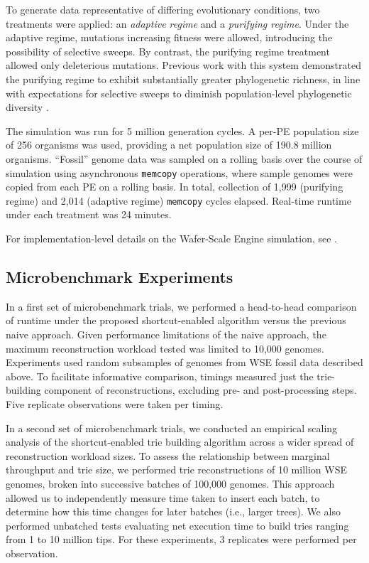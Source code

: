 To generate data representative of differing evolutionary conditions, two treatments were applied: an
\textit{adaptive regime} and a \textit{purifying regime}.
Under the adaptive regime, mutations increasing fitness were allowed, introducing the possibility of selective sweeps.
By contrast, the purifying regime treatment allowed only deleterious mutations.
Previous work with this system demonstrated the purifying regime to exhibit substantially greater phylogenetic richness, in line with expectations for selective sweeps to diminish population-level phylogenetic diversity \citep{moreno2024trackable}.

The simulation was run for 5 million generation cycles.
A per-PE population size of 256 organisms was used, providing a net population size of 190.8 million organisms.
``Fossil'' genome data was sampled on a rolling basis over the course of simulation using asynchronous \texttt{memcopy} operations, where sample genomes were copied from each PE on a rolling basis.
In total, collection of 1,999 (purifying regime) and 2,014 (adaptive regime) \texttt{memcopy} cycles elapsed.
Real-time runtime under each treatment was 24 minutes.

For implementation-level details on the Wafer-Scale Engine simulation, see \citep{moreno2024trackable}.

\subsection{Microbenchmark Experiments}

In a first set of microbenchmark trials, we performed a head-to-head comparison of runtime under the proposed shortcut-enabled algorithm versus the previous naive approach.
Given performance limitations of the naive approach, the maximum reconstruction workload tested was limited to 10,000 genomes.
Experiments used random subsamples of genomes from WSE fossil data described above.
To facilitate informative comparison, timings measured just the trie-building component of reconstructions, excluding pre- and post-processing steps.
Five replicate observations were taken per timing.

In a second set of microbenchmark trials, we conducted an empirical scaling analysis of the shortcut-enabled trie building algorithm across a wider spread of reconstruction workload sizes.
To assess the relationship between marginal throughput and trie size, we performed trie reconstructions of 10 million WSE genomes, broken into successive batches of 100,000 genomes.
This approach allowed us to independently measure time taken to insert each batch, to determine how this time changes for later batches (i.e., larger trees).
We also performed unbatched tests evaluating net execution time to build tries ranging from 1 to 10 million tips.
For these experiments, 3 replicates were performed per observation.

